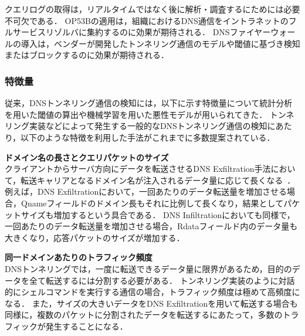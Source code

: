 クエリログの取得は，リアルタイムではなく後に解析・調査するにためには必要不可欠である．
OP53Bの適用は，組織におけるDNS通信をイントラネットのフルサービスリゾルバに集約するのに効果が期待される．
DNSファイヤーウォールの導入は，ベンダーが開発したトンネリング通信のモデルや閾値に基づき検知またはブロックするのに効果が期待される．

\subsubsection{特徴量}
\label{sec:pre-tunnel-feature}
従来，DNSトンネリング通信の検知には，以下に示す特徴量について統計分析を用いた閾値の算出や機械学習を用いた悪性モデルが用いられてきた．
トンネリング実装などによって発生する一般的なDNSトンネリング通信の検知にあたり，以下のような特徴を利用した手法がこれまでに多数提案されている．\newline


\textbf{ドメイン名の長さとクエリパケットのサイズ}\\
クライアントからサーバ方向にデータを転送させるDNS Exfiltration手法において，転送キャリアとなるドメイン名が注入されるデータ量に応じて長くなる~\cite{vern}．
例えば，DNS Exfiltrationにおいて，一回あたりのデータ転送量を増加させる場合，Qnameフィールドのドメイン長もそれに比例して長くなり，結果としてパケットサイズも増加するという具合である．
DNS Infiltrationにおいても同様で，一回あたりのデータ転送量を増加させる場合，Rdataフィールド内のデータ量も大きくなり，応答パケットのサイズが増加する．



\textbf{同一ドメインあたりのトラフィック頻度}\\
DNSトンネリングでは，一度に転送できるデータ量に限界があるため，目的のデータを全て転送するには分割する必要がある．
トンネリング実装のように対話的にシェルコマンドを実行する通信の場合，トラフィック頻度は極めて高頻度になる．
また，サイズの大きいデータをDNS Exfiltrationを用いて転送する場合も同様に，複数のパケットに分割されたデータを転送するにあたって，多数のトラフィックが発生することになる．


